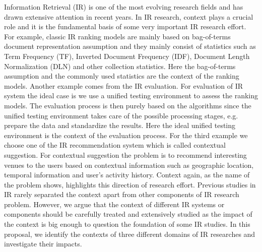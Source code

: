 %
%
Information Retrieval (IR) is one of the most evolving research fields 
and has drawn extensive attention in recent years. 
In IR research, context plays a crucial role and it is the fundamental basis 
of some very important IR research effort.
For example, classic IR ranking models are mainly based on 
bag-of-terms document representation assumption and they mainly 
consist of statistics such as Term Frequency (TF), 
Inverted Document Frequency (IDF), 
Document Length Normalization (DLN) and other collection statistics. 
Here the bag-of-terms assumption 
and the commonly used statistics are the context of the ranking models. 
Another example comes from the IR evaluation. 
For evaluation of IR system the ideal case is we use a unified testing 
environment to assess the ranking models. 
The evaluation process is then purely based on the algorithms since the 
unified testing environment takes care of the possible processing stages, 
e.g. prepare the data and standardize the results. 
Here the ideal unified testing environment is the context of the evaluation 
process. 
For the third example we choose one of the IR recommendation system which is 
called contextual suggestion. For contextual suggestion the problem is to 
recommend interesting venues to the users based on contextual information 
such as geographic location, temporal information and user's activity history. 
Context again, as the name of the problem shows, highlights this direction 
of research effort. 
Previous studies in IR rarely separated the context apart from other 
components of IR research problem. However, we argue that the context of 
different IR systems or components should be carefully treated and extensively 
studied as the impact of the context is big enough to question the foundation 
of some IR studies.
In this proposal, we identify the contexts of three different domains 
of IR researches and investigate their impacts. 

